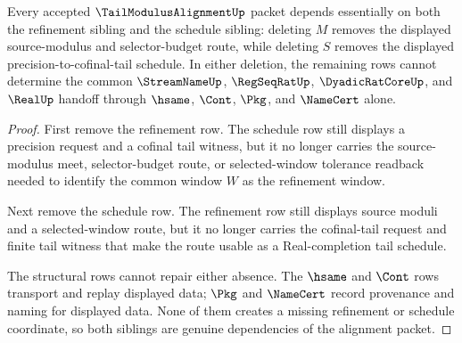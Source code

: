 \begin{closurestatus}{\TailModulusAlignmentUp}
  \theoryclosure{\seedClosure}
  \formalstatus{\unformalizedV}
\end{closurestatus}

\begin{theorem}
\label{thm:tail-modulus-alignment-sibling-dependency}
Every accepted $\TailModulusAlignmentUp$ packet depends essentially on both the refinement sibling and the schedule sibling: deleting $M$ removes the displayed source-modulus and selector-budget route, while deleting $S$ removes the displayed precision-to-cofinal-tail schedule. In either deletion, the remaining rows cannot determine the common $\StreamNameUp$, $\RegSeqRatUp$, $\DyadicRatCoreUp$, and $\RealUp$ handoff through $\hsame$, $\Cont$, $\Pkg$, and $\NameCert$ alone.
\end{theorem}
\begin{proof}
First remove the refinement row. The schedule row still displays a precision request and a cofinal tail witness, but it no longer carries the source-modulus meet, selector-budget route, or selected-window tolerance readback needed to identify the common window $W$ as the refinement window.

Next remove the schedule row. The refinement row still displays source moduli and a selected-window route, but it no longer carries the cofinal-tail request and finite tail witness that make the route usable as a Real-completion tail schedule.

The structural rows cannot repair either absence. The $\hsame$ and $\Cont$ rows transport and replay displayed data; $\Pkg$ and $\NameCert$ record provenance and naming for displayed data. None of them creates a missing refinement or schedule coordinate, so both siblings are genuine dependencies of the alignment packet.
\end{proof}

